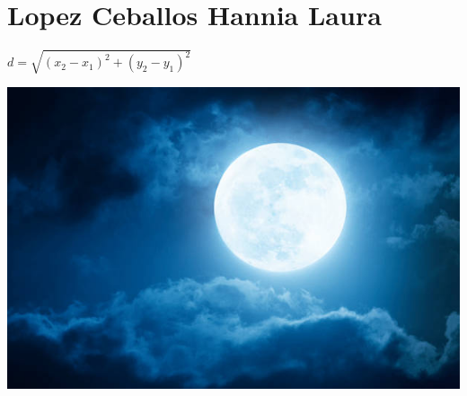 \chapter{Lopez Ceballos Hannia Laura}

$d=\sqrt{(x_2-x_1)^2+(y_2-y_1)^2}$

\includegraphics{./317155657/317155657.jpg}


